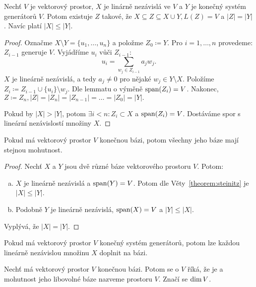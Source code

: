 \begin{theorem}
    \label{theorem:steinitz}
    Nechť $V$ je vektorový prostor, $X$ je linárně nezávislá ve $V$ a $Y$
    je konečný systém generátorů $V$. Potom existuje $Z$ takové, že
    $X \subseteq Z \subseteq X \cup Y, L(Z) = V$ a $|Z| = |Y|$. Navíc platí
    $|X| \leq |Y|$.
\end{theorem}

\begin{proof} Označme $X \setminus Y = \{u_1, \dots, u_n\}$ a položme $Z_0 
    \coloneqq Y$. Pro $i = 1, \dots, n$ provedeme: $Z_{i-1}$ generuje $V$. 
    Vyjádříme $u_i$ vůči $Z_{i-1}$: $$u_i = \sum_{w_j \in Z_{i-1}} a_jw_j.$$
    $X$ je lineárně nezávislá, a tedy $a_j \neq 0$ pro nějaké 
    $w_j \in Y \setminus X$. Položíme $Z_i \coloneqq Z_{i-1} \cup \{u_i\} 
    \setminus {w_j}.$ Dle lemmatu o výměně $\mathop{\mathrm{span}}(Z_i) = V$. Nakonec, 
    $Z \coloneqq Z_n, |Z| = |Z_n| = |Z_{n-1}| = \dots = |Z_0| = |Y|.$ 
    
    Pokud by $|X| > |Y|$, potom $\exists i < n: Z_i \subset X$ a 
    $\mathop{\mathrm{span}}(Z_i) = V$. Dostáváme spor s lineární nezávislostí množiny $X$.
\end{proof}

\begin{corollary}
    Pokud má vektorový prostor $V$ konečnou bázi, potom všechny jeho báze
    mají stejnou mohutnost.
\end{corollary}

\begin{proof}
    Nechť $X$ a $Y$ jsou dvě různé báze vektorového prostoru $V$. Potom:
    \begin{enumerate}[a.]
        \item $X$ je lineárně nezávislá a $\mathop{\mathrm{span}}(Y) = V$. Potom dle 
            Věty~\ref{theorem:steinitz} je $|X| \leq |Y|$.
        \item Podobně $Y$ je lineárně nezávislá, $\mathop{\mathrm{span}}(X) = V$ a 
            $|Y| \leq |X|$.
    \end{enumerate}

    Vyplývá, že $|X| = |Y|$.
\end{proof}

\begin{corollary}
    Pokud má vektorový prostor $V$ konečný systém generátorů, potom lze 
    každou lineárně nezávislou množinu $X$ doplnit na bázi.
\end{corollary}

\begin{definition}
    Nechť má vektorový prostor $V$ konečnou bázi. Potom se o $V$ říká, 
    že je  a mohutnost jeho libovolné báze
    nazveme  prostoru $V$. Značí se $\mathop{\mathrm{dim}} V$.
\end{definition}

